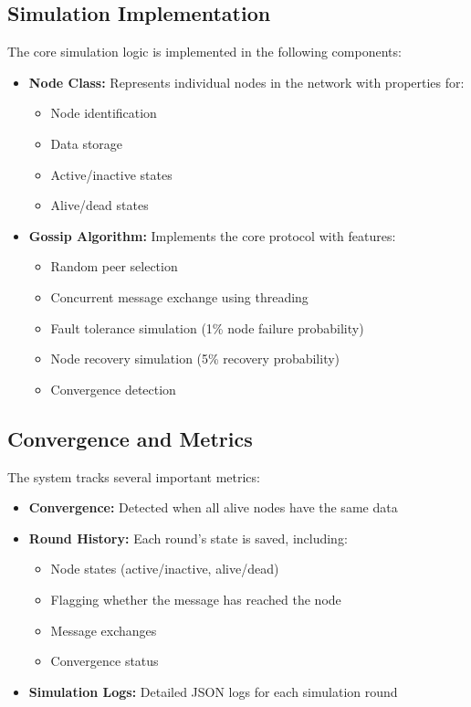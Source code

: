 \documentclass[a4paper,12pt]{article}
\begin{document}
\subsection{Simulation Implementation}
The core simulation logic is implemented in the following components:
\begin{itemize}
    \item \textbf{Node Class:} Represents individual nodes in the network with properties for:
        \begin{itemize}
            \item Node identification
            \item Data storage
            \item Active/inactive states
            \item Alive/dead states
        \end{itemize}
    \item \textbf{Gossip Algorithm:} Implements the core protocol with features:
        \begin{itemize}
            \item Random peer selection
            \item Concurrent message exchange using threading
            \item Fault tolerance simulation (1\% node failure probability)
            \item Node recovery simulation (5\% recovery probability)
            \item Convergence detection
        \end{itemize}
\end{itemize}

\subsection{Convergence and Metrics}
The system tracks several important metrics:
\begin{itemize}
    \item \textbf{Convergence:} Detected when all alive nodes have the same data
    \item \textbf{Round History:} Each round's state is saved, including:
        \begin{itemize}
            \item Node states (active/inactive, alive/dead)
            \item Flagging whether the message has reached the node
            \item Message exchanges
            \item Convergence status
        \end{itemize}
    \item \textbf{Simulation Logs:} Detailed JSON logs for each simulation round
\end{itemize}
\end{document}
